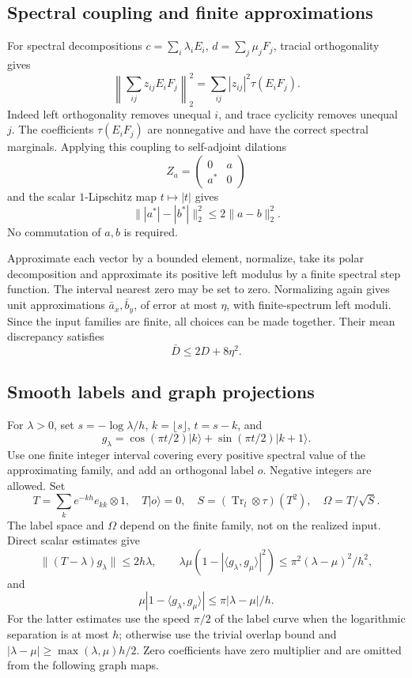 \documentclass[11pt,reqno]{amsart}
\numberwithin{equation}{section}
\begin{document}
\subsection{Spectral coupling and finite approximations}\label{spectral-coupling-and-finite-approximations}

For spectral decompositions \(c=\sum_i\lambda_iE_i\), \(d=\sum_j\mu_jF_j\), tracial orthogonality gives \[
 \left\|\sum_{ij}z_{ij}E_iF_j\right\|_2^2
       =\sum_{ij}|z_{ij}|^2\tau(E_iF_j).
 \tag{A.2}
\] Indeed left orthogonality removes unequal \(i\), and trace cyclicity removes unequal \(j\). The coefficients \(\tau(E_iF_j)\) are nonnegative and have the correct spectral marginals. Applying this coupling to self-adjoint dilations \[
 Z_a=\begin{pmatrix}0&a\\a^*&0\end{pmatrix}
\] and the scalar \(1\)-Lipschitz map \(t\mapsto|t|\) gives \[
 \||a^*|-|b^*|\|_2^2\le2\|a-b\|_2^2. \tag{A.3}
\] No commutation of \(a,b\) is required.

Approximate each vector by a bounded element, normalize, take its polar decomposition and approximate its positive left modulus by a finite spectral step function. The interval nearest zero may be set to zero. Normalizing again gives unit approximations \(\bar a_x,\bar b_y\), of error at most \(\eta\), with finite-spectrum left moduli. Since the input families are finite, all choices can be made together. Their mean discrepancy satisfies \[
 \bar D\le2D+8\eta^2. \tag{A.4}
\]

\subsection{Smooth labels and graph projections}\label{smooth-labels-and-graph-projections}

For \(\lambda>0\), set \(s=-\log\lambda/h\), \(k=\lfloor s\rfloor\), \(t=s-k\), and \[
 g_\lambda=\cos(\pi t/2)|k\rangle+\sin(\pi t/2)|k+1\rangle.
\] Use one finite integer interval covering every positive spectral value of the approximating family, and add an orthogonal label \(o\). Negative integers are allowed. Set \[
 T=\sum_k e^{-kh}e_{kk}\otimes1,\quad T|o\rangle=0,\quad
 S=(\operatorname{Tr}_l\otimes\tau)(T^2),\quad
 \Omega=T/\sqrt S .
\] The label space and \(\Omega\) depend on the finite family, not on the realized input. Direct scalar estimates give \[
 \|(T-\lambda)g_\lambda\|\le2h\lambda,\qquad
 \lambda\mu(1-|\langle g_\lambda,g_\mu\rangle|^2)
       \le\pi^2(\lambda-\mu)^2/h^2, \tag{A.5}
\] and \[
 \mu|1-\langle g_\lambda,g_\mu\rangle|
       \le\pi|\lambda-\mu|/h.
\] For the latter estimates use the speed \(\pi/2\) of the label curve when the logarithmic separation is at most \(h\); otherwise use the trivial overlap bound and \(|\lambda-\mu|\ge\max(\lambda,\mu)h/2\). Zero coefficients have zero multiplier and are omitted from the following graph maps.
\end{document}
